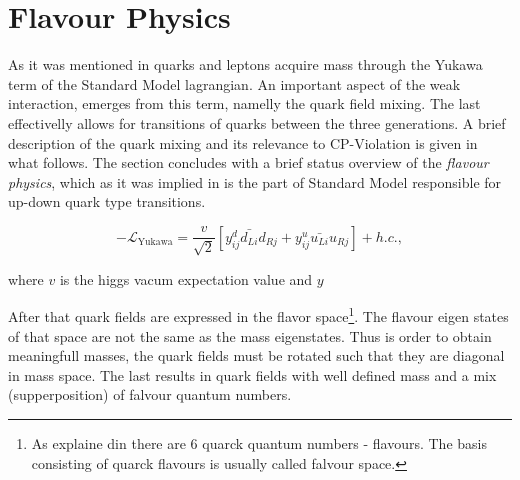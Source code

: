 \section{Flavour Physics}
\label{Flavour_Physics}
As it was mentioned in  quarks and leptons acquire mass through the Yukawa term
of the Standard Model lagrangian. An important aspect of the weak interaction, emerges from this term,
namelly the quark field mixing. The last effectivelly allows for transitions of quarks between the three generations.
A brief description of the quark mixing and its relevance to CP-Violation is given in what follows. The section
concludes with a brief status overview of the {\it flavour physics}, which as it was implied in 
is the part of Standard Model responsible for up-down quark type transitions.


\begin{equation}
  -\mathscr{L}_{\text{Yukawa}} = \frac{v}{\sqrt{2}} \left[ y_{ij}^d \bar{d_{Li}} d_{Rj} + y_{ij}^u \bar{u_{Li}} u_{Rj} \right] + h.c.,
  \label{yukawa_flavour}
\end{equation}

\noindent where $v$ is the higgs vacum expectation value and $y$

After that quark fields are expressed in the flavor
space\footnote{As explaine din  there are 6 quarck quantum numbers - flavours. The basis
consisting of quarck flavours is usually called falvour space.}.
The flavour eigen states of that space are not the same as the mass eigenstates. Thus is order to obtain
meaningfull masses, the quark fields must be rotated such that they are diagonal in mass space.
The last results in quark fields with well defined mass and a mix (supperposition) of falvour quantum numbers.

